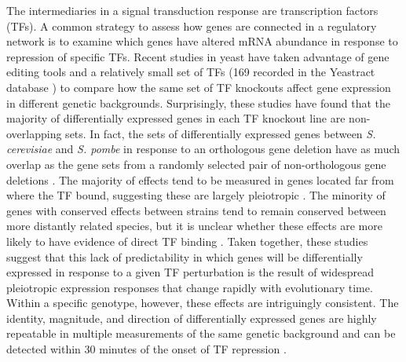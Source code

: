The intermediaries in a signal transduction response are transcription factors (TFs). A common strategy to assess how genes are connected in a regulatory network is to examine which genes have altered mRNA abundance in response to repression of specific TFs. Recent studies in yeast have taken advantage of gene editing tools and a relatively small set of TFs (169 recorded in the Yeastract database \cite{Hahn2011}) to compare how the same set of TF knockouts affect gene expression in different genetic backgrounds. Surprisingly, these studies have found that the majority of differentially expressed genes in each TF knockout line are non-overlapping sets. In fact, the sets of differentially expressed genes between \textit{S. cerevisiae} and \textit{S. pombe} in response to an orthologous gene deletion have as much overlap as the gene sets from a randomly selected pair of non-orthologous gene deletions \cite{Li2025}. The majority of effects tend to be measured in genes located far from where the TF bound, suggesting these are largely pleiotropic \cite{Mahendrawada2025}. The minority of genes with conserved effects between strains tend to remain conserved between more distantly related species, but it is unclear whether these effects are more likely to have evidence of direct TF binding \cite{Liu2024}. Taken together, these studies suggest that this lack of predictability in which genes will be differentially expressed in response to a given TF perturbation is the result of widespread pleiotropic expression responses that change rapidly with evolutionary time. Within a specific genotype, however, these effects are intriguingly consistent. The identity, magnitude, and direction of differentially expressed genes are highly repeatable in multiple measurements of the same genetic background and can be detected within 30 minutes of the onset of TF repression \cite{Mahendrawada2025}.

